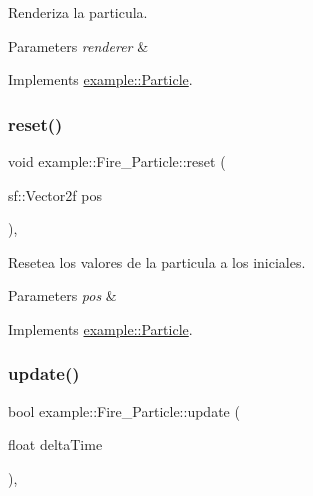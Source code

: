 Renderiza la particula. 


\begin{DoxyParams}{Parameters}
{\em renderer} & \\
\hline
\end{DoxyParams}


Implements \mbox{\hyperlink{classexample_1_1_particle}{example\+::\+Particle}}.

\mbox{\label{classexample_1_1_fire___particle_aa8ac501ef8b43969d47bca8236ab7f73}} 
\subsubsection{\texorpdfstring{reset()}{reset()}}
{\footnotesize\ttfamily void example\+::\+Fire\+\_\+\+Particle\+::reset (\begin{DoxyParamCaption}\item[{sf\+::\+Vector2f}]{pos }\end{DoxyParamCaption})\hspace{0.3cm}{\ttfamily [override]}, {\ttfamily [virtual]}}



Resetea los valores de la particula a los iniciales. 


\begin{DoxyParams}{Parameters}
{\em pos} & \\
\hline
\end{DoxyParams}


Implements \mbox{\hyperlink{classexample_1_1_particle}{example\+::\+Particle}}.

\mbox{\label{classexample_1_1_fire___particle_a92201a3db8fe147e61b0255ab2b99097}} 
\subsubsection{\texorpdfstring{update()}{update()}}
{\footnotesize\ttfamily bool example\+::\+Fire\+\_\+\+Particle\+::update (\begin{DoxyParamCaption}\item[{float}]{delta\+Time }\end{DoxyParamCaption})\hspace{0.3cm}{\ttfamily [override]}, {\ttfamily [virtual]}}




